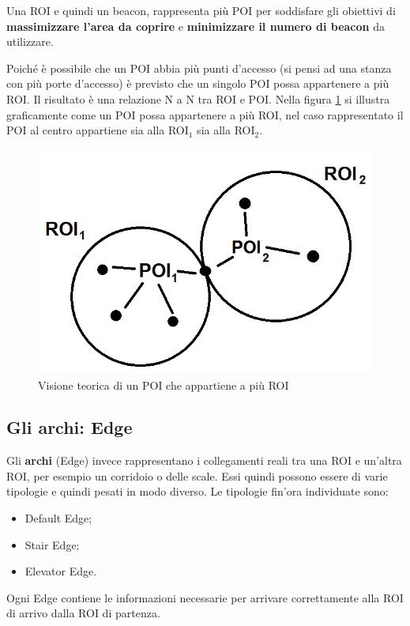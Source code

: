 \documentclass[../ManualeSviluppatore.tex]{subfiles}
\begin{document}
	Una ROI e quindi un \gls{beacon}, rappresenta più POI per soddisfare gli obiettivi di \textbf{massimizzare l'area da coprire} e \textbf{minimizzare il numero di beacon} da utilizzare.
	
	Poiché è possibile che un POI abbia più punti d'accesso (si pensi ad una stanza con più porte d'accesso) è previsto che un singolo POI possa appartenere a più ROI. Il risultato è una relazione N a N tra ROI e POI. Nella figura \ref{fig:ROIePOI-NtoN} si illustra graficamente come un POI possa appartenere a più ROI, nel caso rappresentato il POI al centro appartiene sia alla ROI$_1$ sia alla ROI$_2$.
	
	\begin{figure} [h]
		\centering
		\includegraphics[scale=0.4]{img/POIeROI-NtoN}
		\caption{Visione teorica di un POI che appartiene a più ROI}
		\label{fig:ROIePOI-NtoN}
	\end{figure}
	
	
	\subsection{Gli archi: Edge}
	
	Gli \textbf{archi} (Edge) invece rappresentano i collegamenti reali tra una ROI e un'altra ROI, per esempio un corridoio o delle scale.
	Essi quindi possono essere di varie tipologie e quindi pesati in modo diverso. Le tipologie fin'ora individuate sono:
	\begin{itemize}
		\item Default Edge;
		\item Stair Edge;
		\item Elevator Edge.
	\end{itemize}
	Ogni Edge contiene le informazioni necessarie per arrivare correttamente alla ROI di arrivo dalla ROI di partenza.
	
\end{document}
